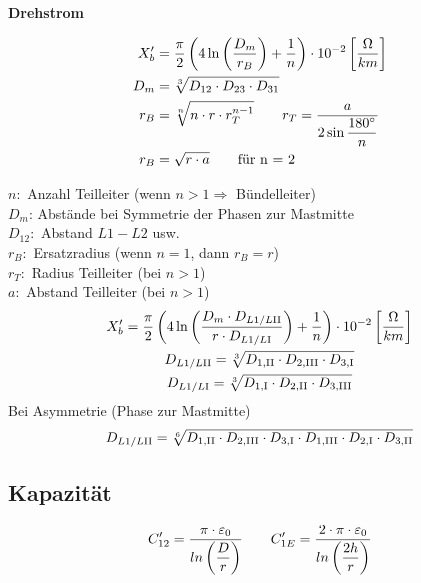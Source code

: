 \begin{itemize}
\textbf{Drehstrom}

\begin{align*}
    X_{b}' &= \frac{\pi}{2} \left( 4 \ln \left( \frac{D_{m}}{r_B}\right) +\frac{1}{n} \right) \cdot 10 ^{-2}   \left[\frac{\Omega}{km}\right]\\
    \vspace{5pt}
    D_{m} &= \sqrt[3]{D_{12} \cdot D_{23} \cdot D_{31}}\\
    r_B &= \sqrt[n]{n \cdot r \cdot r_{T}^{n-1}} \qquad r_T = \frac{a}{2 \sin \dfrac{180 \degree}{n}}\\
    r_B &= \sqrt{r \cdot a} \qquad \textnormal{für n = 2}
\end{align*}

$n:$ Anzahl Teilleiter (wenn $n>1 \Rightarrow$ Bündelleiter)\\
$D_m$: Abstände bei Symmetrie der Phasen zur Mastmitte\\
$D_{12}:$ Abstand $L1 - L2$ usw.\\
$r_B:$ Ersatzradius (wenn $n=1$, dann $r_B = r$)\\
$r_T:$ Radius Teilleiter (bei $n>1$)\\
$a:$ Abstand Teilleiter (bei $n>1$)\\



\begin{gather*}
    X_{b}' = \frac{\pi}{2} \left( 4 \ln \left( \frac{D_{m} \cdot D_{L1/L\RN{2}}}{r \cdot D_{L1/L\RN{1}}}\right) + \frac{1}{n} \right) \cdot 10 ^{-2}   \left[\frac{\Omega}{km}\right]\\
    D_{L1/L\RN{2}} = \sqrt[3]{D_{1,\RN{2}} \cdot D_{2,\RN{3}} \cdot D_{3,\RN{1}}}\\
    D_{L1/L\RN{1}} = \sqrt[3]{D_{1,\RN{1}} \cdot D_{2,\RN{2}} \cdot D_{3,\RN{3}}}
\end{gather*}
Bei Asymmetrie (Phase zur Mastmitte)
\begin{equation*}
    D_{L1/L\RN{2}} = \sqrt[6]{D_{1,\RN{2}} \cdot D_{2,\RN{3}} \cdot D_{3,\RN{1}} \cdot D_{1,\RN{3}} \cdot D_{2,\RN{1}} \cdot D_{3,\RN{2}}}
\end{equation*}

\subsection{Kapazität}
    \begin{equation*}
        C'_{12} = \frac{\pi \cdot \varepsilon_0}{ln\left(\dfrac{D}{r} \right)} \qquad
        C'_{1E} = \frac{2 \cdot \pi \cdot \varepsilon_0}{ln \left( \dfrac{2h}{r} \right)}\\
    \end{equation*}


\end{itemize}
